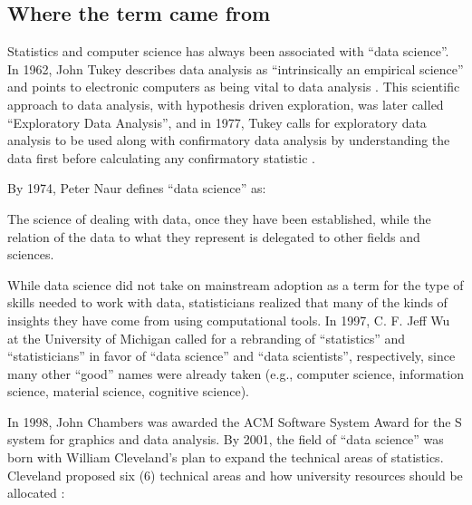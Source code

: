 \documentclass[010-intro.tex]{subfiles}
\begin{document}
\subsection{Where the term came from}

    Statistics and computer science has always been associated with ``data science''.
    In 1962, John Tukey describes data analysis as ``intrinsically an empirical science''
    and points to electronic computers as being vital to data analysis
    \cite{tukeyFutureDataAnalysis1962, pressVeryShortHistory}.
    This scientific approach to data analysis,
    with hypothesis driven exploration, was later called ``Exploratory Data Analysis'', and in 1977,
    Tukey calls for exploratory data analysis to be used along with confirmatory data analysis by understanding
    the data first before calculating any confirmatory statistic
    \cite{tukeyExploratoryDataAnalysis1977}.


    By 1974, Peter Naur \cite{pressVeryShortHistory} defines ``data science'' as:

    \begin{displayquote}
        The science of dealing with data, once they have been established,
        while the relation of the data to what they represent is delegated to other fields and sciences.
    \end{displayquote}

    While data science did not take on mainstream adoption as a term for the type of skills needed to work with data,
    statisticians realized that many of the kinds of insights they have come from using computational tools. %
    In 1997, C. F. Jeff Wu at the University of Michigan called for a rebranding of
    ``statistics'' and ``statisticians'' in favor of
    ``data science'' and ``data scientists'', respectively,
    since many other ``good'' names were already taken
    (e.g., computer science, information science, material science, cognitive science).

    In 1998, John Chambers was awarded the ACM Software System Award for the S system for graphics and data analysis.
    By 2001, the field of ``data science'' was born with William Cleveland's plan to expand the technical areas of statistics.
    Cleveland proposed six (6) technical areas and how university resources should be allocated \cite{clevelandDataScienceAction2001}:
\end{document}
